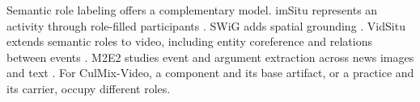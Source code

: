 Semantic role labeling offers a complementary model.
imSitu represents an activity through role-filled participants \citep{Yatskar_2016_CVPR}. SWiG adds spatial grounding \citep{pratt2020grounded}.
VidSitu extends semantic roles to video, including entity coreference and relations between events \citep{Sadhu_2021_CVPR}.
M2E2 studies event and argument extraction across news images and text \citep{li-etal-2020-cross}.
For CulMix-Video, a component and its base artifact, or a practice and its carrier, occupy different roles.
